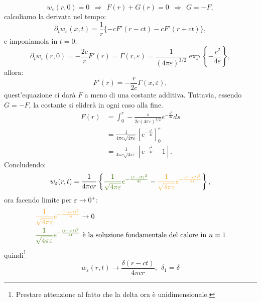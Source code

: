 \documentclass[10pt,a4paper,twoside,openright]{book}
\begin{document}
\begin{equation*}
	w_{\varepsilon }( r,0) =0\ \ \Rightarrow \ \ F( r) +G( r) =0\ \ \Rightarrow \ \ G=-F,
\end{equation*}
calcoliamo la derivata nel tempo:
\begin{equation*}
	\partial _{t} w_{\varepsilon }( x,t) =\frac{1}{r}\{-cF'( r-ct) -cF'( r+ct)\} ,
\end{equation*}
e imponiamola in $\displaystyle t=0$:
\begin{equation*}
	\partial _{t} w_{\varepsilon }( r,0) =-\frac{2c}{r} F'( r) =\Gamma ( r,\varepsilon ) =\frac{1}{( 4\pi \varepsilon )^{3/2}}\exp\left\{-\frac{r^{2}}{4\varepsilon }\right\} ,
\end{equation*}
allora:
\begin{equation*}
	F'( r) =-\frac{r}{2c} \Gamma ( x,\varepsilon ) ,
\end{equation*}
quest'equazione ci darà $\displaystyle F$ a meno di una costante additiva. Tuttavia, essendo $\displaystyle G=-F$, la costante si eliderà in ogni caso alla fine.
\begin{align*}
	F( r) & =\int _{0}^{r} -\frac{s}{2c( 4\pi \varepsilon )^{3/2}} e^{-\frac{s^{2}}{4\varepsilon }} ds      \\
	      & =\frac{1}{4\pi c\sqrt{4\pi \varepsilon }}\left[ e^{-\frac{s^{2}}{4\varepsilon }}\right]_{0}^{r} \\
	      & =\frac{1}{4\pi c\sqrt{4\pi \varepsilon }}\left[ e^{-\frac{r^{2}}{4\varepsilon }} -1\right] .    
\end{align*}
Concludendo:
\begin{equation*}
	w_{\varepsilon }( r,t) =\frac{1}{4\pi cr}\left\{\textcolor[rgb]{0.25,0.46,0.02}{\frac{1}{\sqrt{4\pi \varepsilon }}e^{-\frac{( r-ct)^{2}}{4t}}} -\textcolor[rgb]{0.96,0.65,0.14}{\frac{1}{\sqrt{4\pi \varepsilon }}e^{-\frac{( r+ct)^{2}}{4t}}}\right\} ,
\end{equation*}
ora facendo limite per $\displaystyle \varepsilon \rightarrow 0^{+}$:
\begin{align*}
	\textcolor[rgb]{0.96,0.65,0.14}{\frac{1}{\sqrt{4\pi \varepsilon }}e^{-\frac{( r+ct)^{2}}{4t}}} & \rightarrow 0                                            \\
	\textcolor[rgb]{0.25,0.46,0.02}{\frac{1}{\sqrt{4\pi \varepsilon }}e^{-\frac{( r-ct)^{2}}{4t}}} & \ \text{è la soluzione fondamentale del calore in}\ n=1 
\end{align*}
quindi\footnote{Prestare attenzione al fatto che la delta ora è unidimensionale.}
\begin{equation*}
	w_{\varepsilon }( r,t)\rightarrow \frac{\delta ( r-ct)}{4\pi cr} ,\ \ \delta _{1} =\delta 
\end{equation*}
\end{document}
